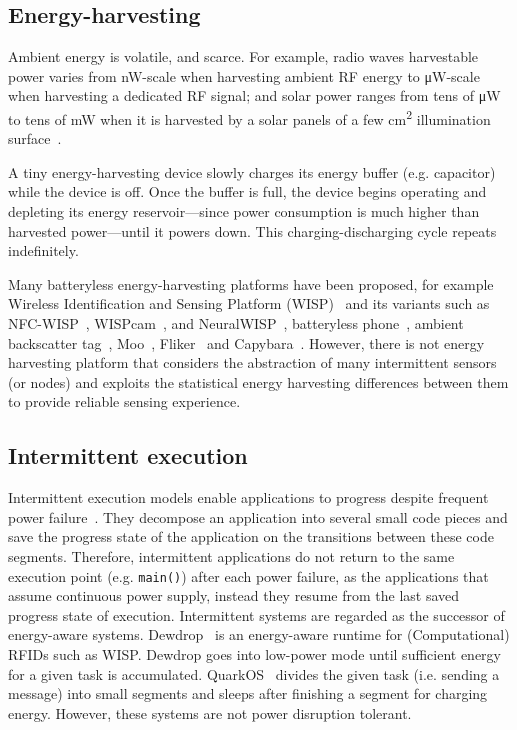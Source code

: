 \subsection{Energy-harvesting}

Ambient energy is volatile, and scarce. For example, radio waves harvestable power varies from \si{\nano\watt}-scale when harvesting ambient RF energy to \si{\uW}-scale when harvesting a dedicated RF signal; and solar power ranges from tens of \si{\uW} to tens of \si{\mW} when it is harvested by a solar panels of a few \si{\cm^2} illumination surface~\cite{lucia2017intermittent,rao2017ambient}.%

A tiny energy-harvesting device slowly charges its energy buffer (e.g. capacitor) while the device is off. Once the buffer is full, the device begins operating and depleting its energy reservoir---since power consumption is much higher than harvested power---until it powers down. This charging-discharging cycle repeats indefinitely. 

Many batteryless energy-harvesting platforms have been proposed, for example Wireless Identification and Sensing Platform (WISP)~\cite{smith_ubicomp_2006} and its variants such as NFC-WISP~\cite{zhao2015nfc}, WISPcam~\cite{naderiparizi_rfid_2015}, and NeuralWISP~\cite{yeager2009neuralwisp}, batteryless phone~\cite{talla2017battery}, ambient backscatter tag~\cite{liu2013ambient}, Moo~\cite{moo}, Fliker~\cite{flickersensys2017} and Capybara~\cite{colin2018reconfigurable}. However, there is not energy harvesting platform that considers the abstraction of many intermittent sensors (or nodes) and exploits the statistical energy harvesting differences between them to provide reliable sensing experience. 

\subsection{Intermittent execution}
Intermittent execution models enable applications to progress despite frequent power failure~\cite{van2016intermittent,colin2016chain,lucia2015simpler,bhatti2017harvos}. They decompose an application into several small code pieces and save the progress state of the application on the transitions between these code segments. Therefore, intermittent applications do not return to the same execution point (e.g. \texttt{main()}) after each power failure, as the applications that assume continuous power supply, instead they resume from the last saved progress state of execution.   
Intermittent systems are regarded as the successor of energy-aware systems. Dewdrop~\cite{buettner2011dewdrop} is an energy-aware runtime for (Computational) RFIDs such as WISP. 
Dewdrop goes into low-power mode until sufficient energy for a given task is accumulated. QuarkOS~\cite{zhang2013quarkos} divides the given task (i.e. sending a message) into small segments and sleeps after finishing a segment for charging energy. However, these systems are not power disruption tolerant.  


